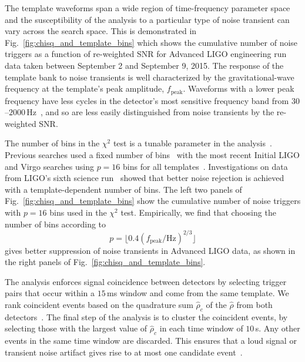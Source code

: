 The template waveforms span a wide region of time-frequency parameter space
and the susceptibility of the analysis to a particular type of noise transient
can vary across the search space. This is demonstrated in
Fig.~\ref{fig:chisq_and_template_bins} which shows the cumulative number of
noise triggers as a function of re-weighted SNR for Advanced LIGO engineering
run data taken between September 2 and September 9, 2015. The response of the
template bank to noise transients is well characterized by the
gravitational-wave frequency at the template's peak amplitude,
$f_\mathrm{peak}$. Waveforms with a lower peak frequency have less cycles in
the detector's most sensitive frequency band from
$30$--$2000$\,Hz~\cite{GW150914-DETECTORS,InstrumentNoisePaper}, and so are
less easily distinguished from noise transients by the re-weighted SNR. 

The number of bins in the $\chi^2$ test is a tunable parameter in the
analysis~\cite{Usman:2015kfa}. Previous searches used a fixed number of
bins~\cite{Babak:2005kv} with the most recent Initial LIGO and Virgo searches
using $p=16$ bins for all templates~\cite{Colaboration:2011np,Aasi:2012rja}.
Investigations on data from LIGO's sixth science
run~\cite{AlexNitzThesis,Aasi:2012rja} showed that better noise rejection is
achieved with a template-dependent number of bins.  The left two panels of
Fig.~\ref{fig:chisq_and_template_bins} show the cumulative number of noise
triggers with $p = 16$ bins used in the $\chi^2$ test.  Empirically, we find
that choosing the number of bins according to
\begin{equation}
p=\lfloor 0.4 (f_\mathrm{peak}/\mathrm{Hz})^{2/3}\rfloor
\label{eq:chisq_bins}
\end{equation}
gives better suppression of noise transients in Advanced LIGO data, as shown
in the right panels of Fig.~\ref{fig:chisq_and_template_bins}.

The \pycbc{} analysis enforces signal coincidence between detectors by
selecting trigger pairs that occur within a $15\,$ms window and come from the
same template.   We rank coincident events based on the quadrature sum
$\hat{\rho}_c$ of the $\hat{\rho}$ from both detectors~\cite{Usman:2015kfa}.
The final step of the analysis is to cluster the coincident events, by
selecting those with the largest value of $\hat{\rho}_c$ in each time window
of $10$\,s. Any other events in the same time window are discarded.  This
ensures that a loud signal or transient noise artifact gives rise to at most
one candidate event~\cite{Usman:2015kfa}. 

